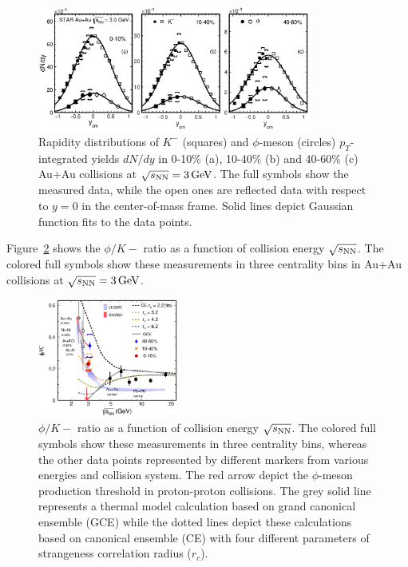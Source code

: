 \documentclass[%
 reprint,	
showpacs,
 amsmath,amssymb,
 aps,
 prc,
]{revtex4-1}
\begin{document}
\begin{figure}
\centering
\includegraphics[width=0.8\textwidth]{fig/fig3_dndy.eps}
  \caption{ Rapidity distributions of $K^-$ (squares) and $\phi$-meson (circles) $p_T$-integrated yields $dN/dy$ in 0-10\% (a), 10-40\% (b) and 40-60\% (c) Au+Au collisions at ${\sqrt{s_{\rm NN}} = \rm{3\,GeV}}$. The full symbols show the measured data, while the open ones are reflected data with respect to $y=0$ in the center-of-mass frame. Solid lines depict Gaussian function fits to the data points.}
\label{fig:phiYSpectra} 
\end{figure}


Figure~\ref{fig:phi2Kratio} shows the $\phi/K-$ ratio as a function of collision energy $\sqrt{s_{\rm NN}}$. The colored full symbols show these measurements in three centrality bins in Au+Au collisions at ${\sqrt{s_{\rm NN}} = \rm{3\,GeV}}$.


\begin{figure}
\centering
\includegraphics[width=0.41\textwidth]{fig/fig4_phi_over_kminus_zoomin.eps}
  \caption{ $\phi/K-$ ratio as a function of collision energy $\sqrt{s_{\rm NN}}$. The colored full symbols show these measurements in three centrality bins, whereas the other data points represented by different markers from various energies and collision system. The red arrow depict the $\phi$-meson production threshold in proton-proton collisions. The grey solid line represents a thermal model calculation based on grand canonical ensemble (GCE) while the dotted lines depict these calculations based on canonical ensemble (CE) with four different parameters of strangeness correlation radius ($r_c$).}
\label{fig:phi2Kratio} 
\end{figure}
\end{document}
